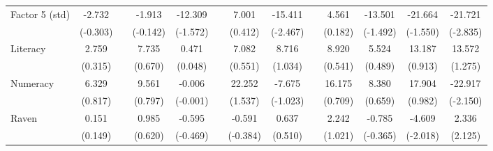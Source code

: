 \begin{table}[htbp]
{\begin{tabular}{lcccccccccccc}
    Factor 5 (std) & -2.732 &       & -1.913 & -12.309 &       & 7.001 & \cellcolor[rgb]{ 1,  1,  0}-15.411 &       & 4.561 & -13.501 & -21.664 & \cellcolor[rgb]{ 1,  1,  0}-21.721 \\
          & (-0.303) &       & (-0.142) & (-1.572) &       & (0.412) & (-2.467) &       & (0.182) & (-1.492) & (-1.550) & (-2.835) \\
    Literacy & 2.759 &       & 7.735 & 0.471 &       & 7.082 & 8.716 &       & 8.920 & 5.524 & 13.187 & 13.572 \\
          & (0.315) &       & (0.670) & (0.048) &       & (0.551) & (1.034) &       & (0.541) & (0.489) & (0.913) & (1.275) \\
    Numeracy & 6.329 &       & 9.561 & -0.006 &       & 22.252 & -7.675 &       & 16.175 & 8.380 & 17.904 & \cellcolor[rgb]{ 1,  1,  0}-22.917 \\
          & (0.817) &       & (0.797) & (-0.001) &       & (1.537) & (-1.023) &       & (0.709) & (0.659) & (0.982) & (-2.150) \\
    Raven & 0.151 &       & 0.985 & -0.595 &       & -0.591 & 0.637 &       & 2.242 & -0.785 & \cellcolor[rgb]{ 1,  1,  0}-4.609 & \cellcolor[rgb]{ 1,  1,  0}2.336 \\
          & (0.149) &       & (0.620) & (-0.469) &       & (-0.384) & (0.510) &       & (1.021) & (-0.365) & (-2.018) & (2.125) \\


\end{tabular}}
\end{table}
